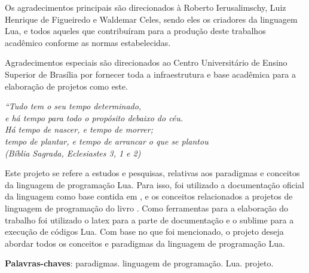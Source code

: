 \documentclass[
12pt, %
openright, %
oneside, %
a4paper, %
english, %
brazil, %
]{abntex2}
\begin{document}
\begin{agradecimentos}
Os agradecimentos principais são direcionados à Roberto Ierusalimschy, Luiz Henrique de Figueiredo e Waldemar Celes, sendo eles os criadores da linguagem Lua, e todos aqueles que contribuíram para a produção deste trabalhos acadêmico conforme
as normas estabelecidas.

Agradecimentos especiais são direcionados ao Centro Universitário de Ensino Superior de Brasília por fornecer toda a infraestrutura e base acadêmica para a elaboração de projetos como este.

\end{agradecimentos}

\begin{epigrafe}
    \vspace*{\fill}
\begin{flushright}
\textit{``Tudo tem o seu tempo determinado, \\
e há tempo para todo o propósito debaixo do céu. \\
Há tempo de nascer, e tempo de morrer; \\
tempo de plantar, e tempo de arrancar o que se plantou\\
(Bíblia Sagrada, Eclesiastes 3, 1 e 2)}
\end{flushright}
\end{epigrafe}


\begin{resumo}
Este projeto se refere a estudos e pesquisas, relativas aos paradigmas e conceitos da linguagem de programação Lua. Para isso, foi utilizado a documentação oficial da linguagem como base contida em \cite{Lua_Org}, e os conceitos relacionados a projetos de linguagem de programação do livro \cite{Sebesta}. Como ferramentas para a elaboração do trabalho foi utilizado o latex para a parte de documentação e o sublime para a execução de códigos Lua. Com base no que foi mencionado, o projeto deseja abordar todos os conceitos e paradigmas da linguagem de programação Lua.

 \noindent
 \textbf{Palavras-chaves}: paradigmas. linguagem de programação. Lua. projeto.
\end{resumo}
\end{document}
